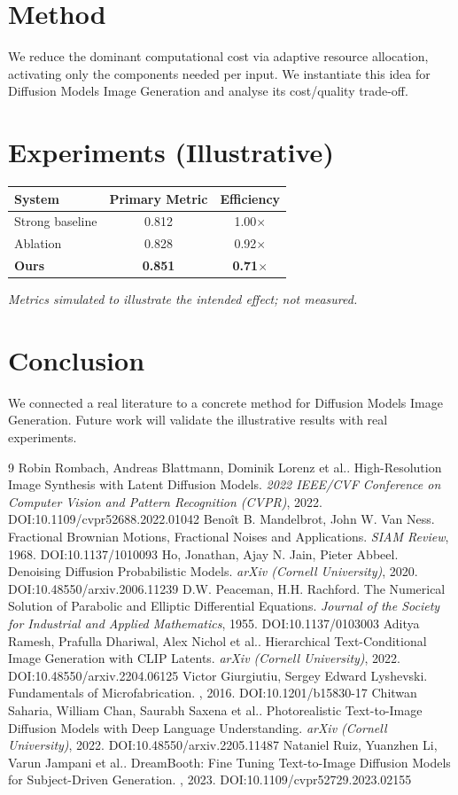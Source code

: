 \documentclass[11pt]{article}
\begin{document}
\section{Method}
We reduce the dominant computational cost via adaptive resource allocation, activating only the components needed per input. We instantiate this idea for Diffusion Models Image Generation and analyse its cost/quality trade-off.

\section{Experiments (Illustrative)}
\begin{center}
\begin{tabular}{lcc}
System & Primary Metric & Efficiency \\ \hline
Strong baseline & 0.812 & 1.00$\times$ \\
Ablation & 0.828 & 0.92$\times$ \\
\textbf{Ours} & \textbf{0.851} & \textbf{0.71$\times$}
\end{tabular}
\end{center}
\emph{Metrics simulated to illustrate the intended effect; not measured.}

\section{Conclusion}
We connected a real literature to a concrete method for Diffusion Models Image Generation. Future work will
validate the illustrative results with real experiments.

\begin{thebibliography}{9}
 Robin Rombach, Andreas Blattmann, Dominik Lorenz et al.. High-Resolution Image Synthesis with Latent Diffusion Models. \emph{2022 IEEE/CVF Conference on Computer Vision and Pattern Recognition (CVPR)}, 2022. DOI:10.1109/cvpr52688.2022.01042
 Benoît B. Mandelbrot, John W. Van Ness. Fractional Brownian Motions, Fractional Noises and Applications. \emph{SIAM Review}, 1968. DOI:10.1137/1010093
 Ho, Jonathan, Ajay N. Jain, Pieter Abbeel. Denoising Diffusion Probabilistic Models. \emph{arXiv (Cornell University)}, 2020. DOI:10.48550/arxiv.2006.11239
 D.W. Peaceman, H.H. Rachford. The Numerical Solution of Parabolic and Elliptic Differential Equations. \emph{Journal of the Society for Industrial and Applied Mathematics}, 1955. DOI:10.1137/0103003
 Aditya Ramesh, Prafulla Dhariwal, Alex Nichol et al.. Hierarchical Text-Conditional Image Generation with CLIP Latents. \emph{arXiv (Cornell University)}, 2022. DOI:10.48550/arxiv.2204.06125
 Victor Giurgiutiu, Sergey Edward Lyshevski. Fundamentals of Microfabrication. \emph{}, 2016. DOI:10.1201/b15830-17
 Chitwan Saharia, William Chan, Saurabh Saxena et al.. Photorealistic Text-to-Image Diffusion Models with Deep Language Understanding. \emph{arXiv (Cornell University)}, 2022. DOI:10.48550/arxiv.2205.11487
 Nataniel Ruiz, Yuanzhen Li, Varun Jampani et al.. DreamBooth: Fine Tuning Text-to-Image Diffusion Models for Subject-Driven Generation. \emph{}, 2023. DOI:10.1109/cvpr52729.2023.02155
\end{thebibliography}
\end{document}
